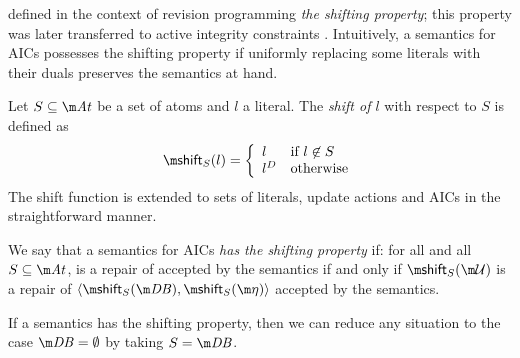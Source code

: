 {\citet{tcs/MarekT98} defined in the context of revision programming \emph{the shifting property}; this property was later transferred to active integrity constraints \cite{tplp/CaropreseT11}. 
Intuitively, a semantics for AICs possesses the shifting property if uniformly replacing some literals with their duals
preserves the semantics at hand. 

\begin{definition}
 Let $S\subseteq\atoms$ be a set of atoms and $l$ a literal. The \emph{shift of $l$} with respect to $S$ is defined as 
 \[\shift_S(l) = \left\{\begin{array}{ll}                                                                                                             l&\text{if $l\not\in S$}\\                                                                                                              l^D&\text{otherwise}                                                                                                                                      \end{array}\right.\]
 The shift function is extended to sets of literals, update actions and AICs in the straightforward manner. 
\end{definition}

\begin{definition}
 We say that a semantics for AICs \emph{has the shifting property} if: for all \fulldb and all $S\subseteq \atoms$, \UU is a repair of \fulldb accepted by the semantics if and only if $\shift_S(\UU)$ is a repair of $\langle\shift_S(\db),\shift_S(\aics)\rangle$ accepted by the semantics.
\end{definition}

If a semantics has the shifting property, then we can reduce any situation to the case $\db=\emptyset$ by taking $S=\db$. 
}
